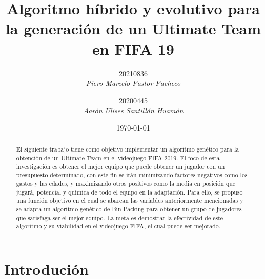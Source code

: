 \documentclass{article}
\begin{document}

\title{Algoritmo híbrido y evolutivo para la generación de un Ultimate Team en FIFA 19}
\author{
    20210836\\
    \textit{Piero Marcelo Pastor Pacheco}\\
    \and
    20200445\\
    \textit{Aarón Ulises Santillán Huamán}
}
\date{\today}
\maketitle
\begin{abstract}
    El siguiente trabajo tiene como objetivo implementar un algoritmo genético para la obtención de un Ultimate Team en el videojuego FIFA 2019.  El foco de esta investigación es obtener el mejor equipo que puede obtener un jugador con un presupuesto determinado, con este fin se irán minimizando factores negativos como los gastos y las edades, y maximizando otros positivos como la media en posición que jugará, potencial y química de todo el equipo en la adaptación. Para ello, se propuso una función objetivo en el cual se abarcan las variables anteriormente mencionadas y se adapta un algoritmo genético de Bin Packing para obtener un grupo de jugadores que satisfaga ser el mejor equipo. La meta es demostrar la efectividad de este algoritmo y su viabilidad en el videojuego FIFA, el cual puede ser mejorado.\newline
\end{abstract}


\section{Introdución}
\end{document}
